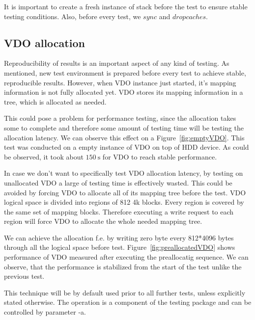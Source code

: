 \documentclass[
  color, %
  table, %
  lof,   %
  lot,   %
]{fithesis3}
\begin{document}
It is important to create a fresh instance of stack before the test to ensure stable testing conditions. Also, before every test, we $sync$ and $drop caches$. 

\subsection{VDO allocation}
\label{alloc}
Reproducibility of results is an important aspect of any kind of testing. As mentioned, new test environment is prepared before every test to achieve stable, reproducible results. However, when VDO instance just started, it's mapping information is not fully allocated yet. VDO stores its mapping information in a tree, which is allocated as needed.

This could pose a problem for performance testing, since the allocation takes some to complete and therefore some amount of testing time will be testing the allocation latency. We can observe this effect on a Figure~\ref{fig:emptyVDO}. This test was conducted on a empty instance of VDO on top of HDD device. As could be observed, it took about $\SI{150}{\second}$ for VDO to reach stable performance.

In case we don't want to specifically test VDO allocation latency, by testing on unallocated VDO a large of testing time is effectively wasted. This could be avoided by forcing VDO to allocate all of its mapping tree before the test. VDO logical space is divided into regions of 812 4k blocks. Every region is covered by the same set of mapping blocks. Therefore executing a write request to each region will force VDO to allocate the whole needed mapping tree. 

We can achieve the allocation f.e. by writing zero byte every 812*4096 bytes through all the logical space before test. Figure~\ref{fig:preallocatedVDO} shows performance of VDO measured after executing the preallocatig sequence. We can observe, that the performance is stabilized from the start of the test unlike the previous test.

This technique will be by default used prior to all further tests, unless explicitly stated otherwise. The operation is a component of the testing package and can be controlled by parameter -a.
\end{document}
